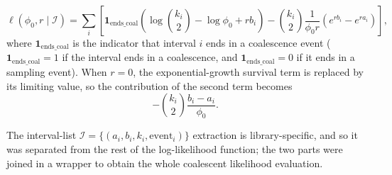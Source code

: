 \documentclass[11pt, a4paper]{article}
\begin{document}
\begin{equation}
\ell(\phi_0,r \mid \mathcal{I}) =
\sum_{i} \left[
\mathbf{1}_{\text{ends\_coal}}\left( \log\binom{k_i}{2} - \log\phi_0 + r b_i \right)
- \binom{k_i}{2} \frac{1}{\phi_0 r}\left( e^{r b_i} - e^{r a_i} \right)
\right],
\end{equation}
where $\mathbf{1}_{\text{ends\_coal}}$ is the indicator that interval $i$ ends in a coalescence event ($\mathbf{1}_{\text{ends\_coal}}=1$ if the interval ends in a coalescence, and $\mathbf{1}_{\text{ends\_coal}}=0$ if it ends in a sampling event).
When $r=0$, the exponential-growth survival term is replaced by its limiting value, so the contribution of the second term becomes
\begin{equation}
- \binom{k_i}{2} \frac{b_i-a_i}{\phi_0}.
\end{equation}

The interval-list $\mathcal{I}=\{(a_i,b_i,k_i,\text{event}_i)\}$ extraction is library-specific, and so it was separated from the rest of the log-likelihood function; the two parts were joined in a wrapper to obtain the whole coalescent likelihood evaluation. 
\end{document}
